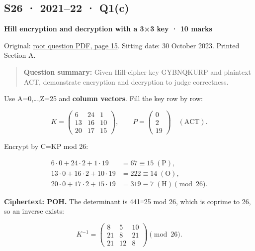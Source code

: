 \documentclass[11pt,a4paper]{article}
\begin{document}
\clearpage
\subsection{S26 · 2021–22 · Q1(c)}\label{s26}

\textbf{Hill encryption and decryption with a 3×3 key · 10 marks}


Original: \href{../../CSE405-Security_Merged.pdf\#page=15}{root question PDF,\allowbreak{} page 15}. Sitting date: 30 October 2023. Printed Section A.



\begin{quote}\small

\textbf{Question summary:} Given Hill-cipher key GYBNQKURP and plaintext ACT,\allowbreak{} demonstrate encryption and decryption to judge correctness.



\end{quote}

Use A=\allowbreak{}0,\allowbreak{}…,\allowbreak{}Z=\allowbreak{}25 and \textbf{column vectors}. Fill the key row by row:



\[
K=\begin{pmatrix}6&24&1\\13&16&10\\20&17&15\end{pmatrix},\qquad P=\begin{pmatrix}0\\2\\19\end{pmatrix}\quad(\mathrm{ACT}).
\]

Encrypt by C=\allowbreak{}KP mod 26:



\[
\begin{aligned}6\cdot0+24\cdot2+1\cdot19&=67\equiv15\;(\mathrm P),\\13\cdot0+16\cdot2+10\cdot19&=222\equiv14\;(\mathrm O),\\20\cdot0+17\cdot2+15\cdot19&=319\equiv7\;(\mathrm H)\pmod{26}.\end{aligned}
\]

\textbf{Ciphertext: POH.} The determinant is 441≡25 mod 26,\allowbreak{} which is coprime to 26,\allowbreak{} so an inverse exists:



\[
K^{-1}=\begin{pmatrix}8&5&10\\21&8&21\\21&12&8\end{pmatrix}\pmod{26}.
\]
\end{document}
